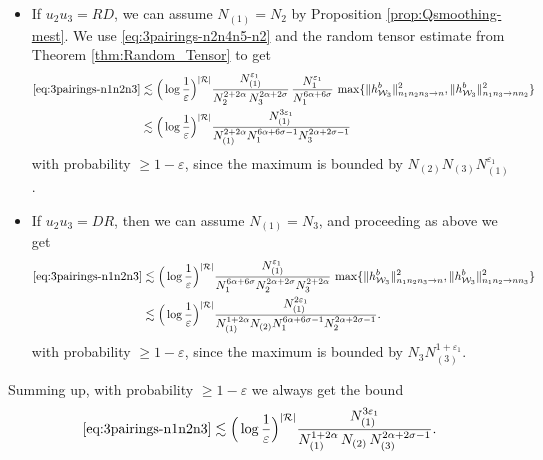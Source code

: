 \documentclass[11pt, xcolor = dvipsnames,reqno
]{amsart}
\theoremstyle{definition}
\theoremstyle{remark}
\begin{document}
\begin{itemize}
\begin{itemize}
            \item If $u_2 u_3 = RD$, we can assume $N_{(1)} = N_2$ by Proposition \ref{prop:Qsmoothing-mest}. We use \eqref{eq:3pairings-n2n4n5-n2} and the random tensor estimate from Theorem \ref{thm:Random_Tensor} to get 
        \begin{align*}
             \eqref{eq:3pairings-n1n2n3}  
             &\lesssim \Big( \log \frac{1}{\varepsilon} \Big)^{|\mathcal{R}|} \frac{N_{(1)}^{\varepsilon_1}}{N_2^{2 + 2\alpha}\, N_3^{ 2\alpha  + 2\sigma }} \, 
             \frac{N_1^{\varepsilon_1}}{N_1^{6\alpha + 6\sigma}} \, \max\{\|h^b_{\mathcal{W}_3}\|_{n_1n_2n_3 \rightarrow n}^2 , \|h^b_{\mathcal{W}_3}\|_{n_1n_3 \rightarrow nn_2}^2 \} \\
             & \lesssim \Big(\log  \frac{1}{\varepsilon} \Big)^{|\mathcal R|} \frac{N_{(1)}^{3\varepsilon_1}}{ N_{(1)}^{2 + 2\alpha} N_{1}^{6\alpha + 6\sigma - 1 }  N_{3}^{2\alpha + 2\sigma - 1}}
        \end{align*}
        with probability $\geq 1 - \varepsilon$, since the maximum is bounded by $N_{(2)} N_{(3)} N_{(1)}^{\varepsilon_1} $.  

            \item If $u_2 u_3 = DR$, then we can assume $N_{(1)} = N_3$, and proceeding as above we get
        \begin{align*}
             \eqref{eq:3pairings-n1n2n3}  &\lesssim \Big( \log \frac{1}{\varepsilon} \Big)^{|\mathcal{R}|} \frac{N_{(1)}^{\varepsilon_1} }{ N_1^{6\alpha + 6 \sigma} N_2^{ 2\alpha  + 2\sigma } N_3^{2 + 2\alpha}} \, 
             \max\{\|h^b_{\mathcal{W}_3}\|_{n_1n_2n_3 \rightarrow n}^2 , \|h^b_{\mathcal{W}_3}\|_{n_1n_2 \rightarrow nn_3}^2 \} \\
             &\lesssim \Big(\log  \frac{1}{\varepsilon} \Big)^{|\mathcal R|} \frac{N_{(1)}^{2\varepsilon_1}}{ N_{(1)}^{1 + 2\alpha} N_{(2)} N_{1}^{6\alpha + 6\sigma - 1}  N_{2}^{2\alpha + 2\sigma - 1}}.
         \end{align*}
         with probability $\geq 1 - \varepsilon$, since the maximum is bounded by $N_3 N_{(3)}^{1+\varepsilon_1}$. 
        \end{itemize}      

    Summing up, with probability $\geq 1 - \varepsilon$ we always get the bound 
    \begin{align}
         \eqref{eq:3pairings-n1n2n3}
         \lesssim \Big(\log  \frac{1}{\varepsilon} \Big)^{|\mathcal R|}  \frac{N_{(1)}^{3\varepsilon_1}}{N_{(1)}^{1 + 2\alpha} \, N_{(2)}\,  N_{(3)}^{2\alpha + 2\sigma - 1}}.
    \end{align}

    \end{itemize}
    
\end{document}
